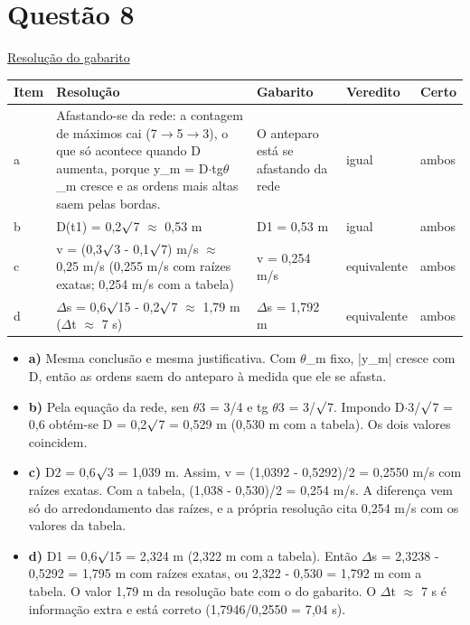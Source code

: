 \documentclass{article}%
\begin{document}
\section*{Questão 8}%
\href{https://poliedroresolve.sistemapoliedro.com.br/vestibulares/ime/2027/ime-2-fase-dia-2-27-10-2026-2-fase-dia-2/dissertativa-8-fisica-2-fase-dia-2-ime-2027}{Resolução do gabarito}\par\smallskip%
\begin{longtable}{@{}p{} p{} p{} p{} p{}@{}}\toprule Item & Resolução & Gabarito & Veredito & Certo \\ \midrule
a & Afastando{-}se da rede: a contagem de máximos cai (7$\to$5$\to$3), o que só acontece quando D aumenta, porque y\_m = D$\cdot$tg$\theta$\_m cresce e as ordens mais altas saem pelas bordas. & O anteparo está se afastando da rede & igual & ambos \\
b & D(t1) = 0,2$\surd$7 $\approx$ 0,53 m & D1 = 0,53 m & igual & ambos \\
c & v = (0,3$\surd$3 - 0,1$\surd$7) m/s $\approx$ 0,25 m/s (0,255 m/s com raízes exatas; 0,254 m/s com a tabela) & v = 0,254 m/s & equivalente & ambos \\
d & $\Delta$s = 0,6$\surd$15 - 0,2$\surd$7 $\approx$ 1,79 m ($\Delta$t $\approx$ 7 s) & $\Delta$s = 1,792 m & equivalente & ambos \\
\bottomrule\end{longtable}%
\begin{itemize}%
\item%
\textbf{a)} Mesma conclusão e mesma justificativa. Com $\theta$\_m fixo, |y\_m| cresce com D, então as ordens saem do anteparo à medida que ele se afasta.%
\item%
\textbf{b)} Pela equação da rede, sen $\theta$3 = 3/4 e tg $\theta$3 = 3/$\surd$7. Impondo D$\cdot$3/$\surd$7 = 0,6 obtém{-}se D = 0,2$\surd$7 = 0,529 m (0,530 m com a tabela). Os dois valores coincidem.%
\item%
\textbf{c)} D2 = 0,6$\surd$3 = 1,039 m. Assim, v = (1,0392 - 0,5292)/2 = 0,2550 m/s com raízes exatas. Com a tabela, (1,038 - 0,530)/2 = 0,254 m/s. A diferença vem só do arredondamento das raízes, e a própria resolução cita 0,254 m/s com os valores da tabela.%
\item%
\textbf{d)} D1 = 0,6$\surd$15 = 2,324 m (2,322 m com a tabela). Então $\Delta$s = 2,3238 - 0,5292 = 1,795 m com raízes exatas, ou 2,322 - 0,530 = 1,792 m com a tabela. O valor 1,79 m da resolução bate com o do gabarito. O $\Delta$t $\approx$ 7 s é informação extra e está correto (1,7946/0,2550 = 7,04 s).%
\end{itemize}%
\end{document}
